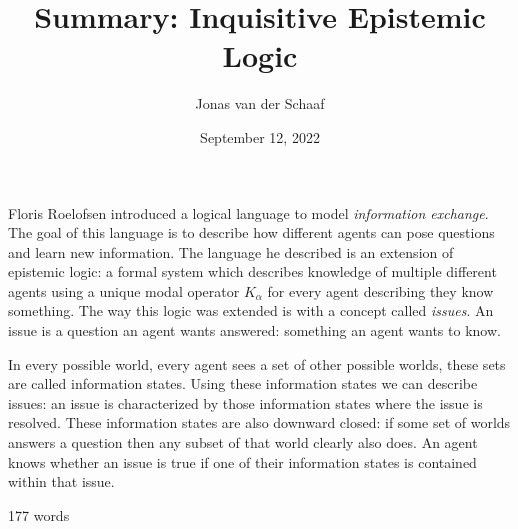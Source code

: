 \documentclass{article}
\title{Summary: Inquisitive Epistemic Logic}
\author{Jonas van der Schaaf}
\date{September 12, 2022}
\begin{document}
\maketitle

Floris Roelofsen introduced a logical language to model \emph{information
    exchange}. The goal of this language is to describe how different agents can
pose questions and learn new information. The language he described is an
extension of epistemic logic: a formal system which describes knowledge of
multiple different agents using a unique modal operator \(K_{\alpha}\) for
every agent describing they know something. The way this logic was extended
is with a concept called \emph{issues}. An issue is a question an agent
wants answered: something an agent wants to know.

In every possible world, every agent sees a set of other possible worlds, these
sets are called information states. Using these information states we can
describe issues: an issue is characterized by those information states where the
issue is resolved. These information states are also downward closed: if some
set of worlds answers a question then any subset of that world clearly also
does. An agent knows whether an issue is true if one of their information states
is contained within that issue.

\hfill 177 words
\end{document}
